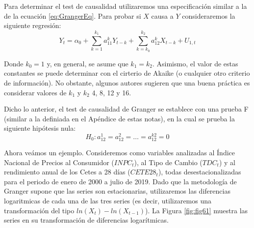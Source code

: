 \documentclass[
]{book}
\begin{document}
Para determinar el test de causalidad utilizaremos una especificación similar a la de la ecuación \eqref{eq:GrangerEq}. Para probar si \(X\) causa a \(Y\) consideraremos la siguiente regresión:
\begin{equation}
    Y_t = \alpha_0 + \sum^{k_1}_{k = 1} a^k_{11} Y_{t-k} + \sum^{k_2}_{k = k_0} a^k_{12} X_{t-k} + U_{1,t}
\end{equation}

Donde \(k_0 = 1\) y, en general, se asume que \(k_1 = k_2\). Asimismo, el valor de estas constantes se puede determinar con el cirterio de Akaike (o cualquier otro criterio de información). No obstante, algunos autores sugieren que una buena práctica es considerar valores de \(k_1\) y \(k_2\) 4, 8, 12 y 16.

Dicho lo anterior, el test de causalidad de Granger se establece con una prueba F (similar a la definiada en el Apéndice de estas notas), en la cual se prueba la siguiente hipótesis nula:
\begin{equation}
    H_0: a^1_{12} = a^2_{12} = \ldots = a^{k2}_{12} = 0
\end{equation}

Ahora veámos un ejemplo. Consideremos como variables analizadas al Índice Nacional de Precios al Consumidor (\(INPC_t\)), al Tipo de Cambio (\(TDC_t\)) y al rendimiento anual de los Cetes a 28 días (\(CETE28_t\)), todas desestacionalizadas para el periodo de enero de 2000 a julio de 2019. Dado que la metodología de Granger supone que las series son estacionarias, utilizaremos las diferencias logaritmicas de cada una de las tres series (es decir, utilizaremos una transformación del tipo \(ln(X_t) - ln(X_{t-1})\)). La Figura \ref{fig:fig61} muestra las series en su transformación de diferencias logarítmicas.
\end{document}
